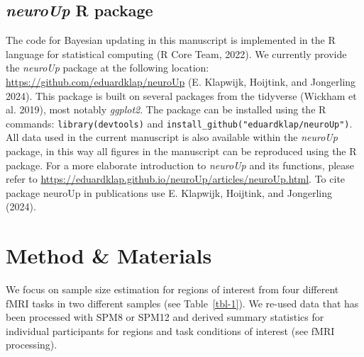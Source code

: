 \documentclass[
  letterpaper,
  DIV=11,
  numbers=noendperiod]{scrartcl}
\begin{document}
\subsection{\texorpdfstring{\emph{neuroUp} R
package}{neuroUp R package}}\label{neuroup-r-package}

The code for Bayesian updating in this manuscript is implemented in the
R language for statistical computing (R Core Team, 2022). We currently
provide the \emph{neuroUp} package at the following location:
\url{https://github.com/eduardklap/neuroUp} (E. Klapwijk, Hoijtink, and
Jongerling 2024). This package is built on several packages from the
tidyverse (Wickham et al. 2019), most notably \emph{ggplot2}. The
package can be installed using the R commands:
\texttt{library(devtools)} and
\texttt{install\_github("eduardklap/neuroUp")}. All data used in the
current manuscript is also available within the \emph{neuroUp} package,
in this way all figures in the manuscript can be reproduced using the R
package. For a more elaborate introduction to \emph{neuroUp} and its
functions, please refer to
\url{https://eduardklap.github.io/neuroUp/articles/neuroUp.html}. To
cite package neuroUp in publications use E. Klapwijk, Hoijtink, and
Jongerling (2024).

\section{Method \& Materials}\label{method-materials}

We focus on sample size estimation for regions of interest from four
different fMRI tasks in two different samples (see Table~\ref{tbl-1}).
We re-used data that has been processed with SPM8 or SPM12 and derived
summary statistics for individual participants for regions and task
conditions of interest (see fMRI processing).
\end{document}
